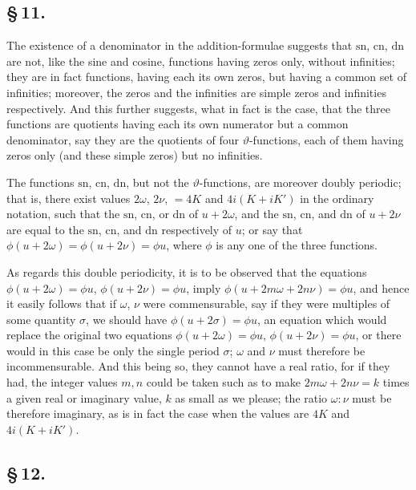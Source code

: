 \documentclass[11pt,a4paper]{book}
\providecommand{\sn}{\mathrm{sn}}
\providecommand{\cn}{\mathrm{cn}}
\providecommand{\dn}{\mathrm{dn}}
\begin{document}
\subsection*{\S\,11.}

The existence of a denominator in the addition-formulae suggests that $\sn$, $\cn$, $\dn$ are not, like the sine and cosine, functions having zeros only, without infinities; they are in fact functions, having each its own zeros, but having a common set of infinities; moreover, the zeros and the infinities are simple zeros and infinities respectively. And this further suggests, what in fact is the case, that the three functions are quotients having each its own numerator but a common denominator, say they are the quotients of four $\vartheta$-functions, each of them having zeros only (and these simple zeros) but no infinities.

The functions $\sn$, $\cn$, $\dn$, but not the $\vartheta$-functions, are moreover doubly periodic; that is, there exist values $2\omega$, $2\nu$, $= 4K$ and $4i(K + iK')$ in the ordinary notation, such that the $\sn$, $\cn$, or $\dn$ of $u + 2\omega$, and the $\sn$, $\cn$, and $\dn$ of $u + 2\nu$ are equal to the $\sn$, $\cn$, and $\dn$ respectively of $u$; or say that $\phi(u + 2\omega) = \phi(u + 2\nu) = \phi u$, where $\phi$ is any one of the three functions.

As regards this double periodicity, it is to be observed that the equations $\phi(u + 2\omega) = \phi u$, $\phi(u + 2\nu) = \phi u$, imply $\phi(u + 2m\omega + 2n\nu) = \phi u$, and hence it easily follows that if $\omega$, $\nu$ were commensurable, say if they were multiples of some quantity $\sigma$, we should have $\phi(u + 2\sigma) = \phi u$, an equation which would replace the original two equations $\phi(u + 2\omega) = \phi u$, $\phi(u + 2\nu) = \phi u$, or there would in this case be only the single period $\sigma$; $\omega$ and $\nu$ must therefore be incommensurable. And this being so, they cannot have a real ratio, for if they had, the integer values $m, n$ could be taken such as to make $2m\omega + 2n\nu = k$ times a given real or imaginary value, $k$ as small as we please; the ratio $\omega : \nu$ must be therefore imaginary, as is in fact the case when the values are $4K$ and $4i(K + iK')$.

\subsection*{\S\,12.}
\end{document}

